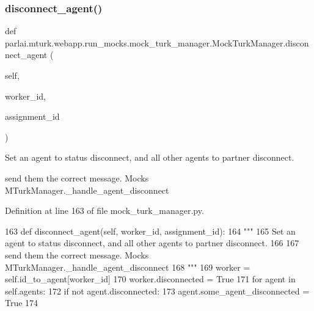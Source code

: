 \subsubsection{\texorpdfstring{disconnect\+\_\+agent()}{disconnect\_agent()}}
{\footnotesize\ttfamily def parlai.\+mturk.\+webapp.\+run\+\_\+mocks.\+mock\+\_\+turk\+\_\+manager.\+Mock\+Turk\+Manager.\+disconnect\+\_\+agent (\begin{DoxyParamCaption}\item[{}]{self,  }\item[{}]{worker\+\_\+id,  }\item[{}]{assignment\+\_\+id }\end{DoxyParamCaption})}

\begin{DoxyVerb}Set an agent to status disconnect, and all other agents to partner disconnect.

send them the correct message. Mocks MTurkManager._handle_agent_disconnect
\end{DoxyVerb}
 

Definition at line 163 of file mock\+\_\+turk\+\_\+manager.\+py.


\begin{DoxyCode}
163     \textcolor{keyword}{def }disconnect\_agent(self, worker\_id, assignment\_id):
164         \textcolor{stringliteral}{"""}
165 \textcolor{stringliteral}{        Set an agent to status disconnect, and all other agents to partner disconnect.}
166 \textcolor{stringliteral}{}
167 \textcolor{stringliteral}{        send them the correct message. Mocks MTurkManager.\_handle\_agent\_disconnect}
168 \textcolor{stringliteral}{        """}
169         worker = self.id\_to\_agent[worker\_id]
170         worker.disconnected = \textcolor{keyword}{True}
171         \textcolor{keywordflow}{for} agent \textcolor{keywordflow}{in} self.agents:
172             \textcolor{keywordflow}{if} \textcolor{keywordflow}{not} agent.disconnected:
173                 agent.some\_agent\_disconnected = \textcolor{keyword}{True}
174 
\end{DoxyCode}
\mbox{\label{classparlai_1_1mturk_1_1webapp_1_1run__mocks_1_1mock__turk__manager_1_1MockTurkManager_a36641c93bb824e26b0570b345cca7bcf}} 

